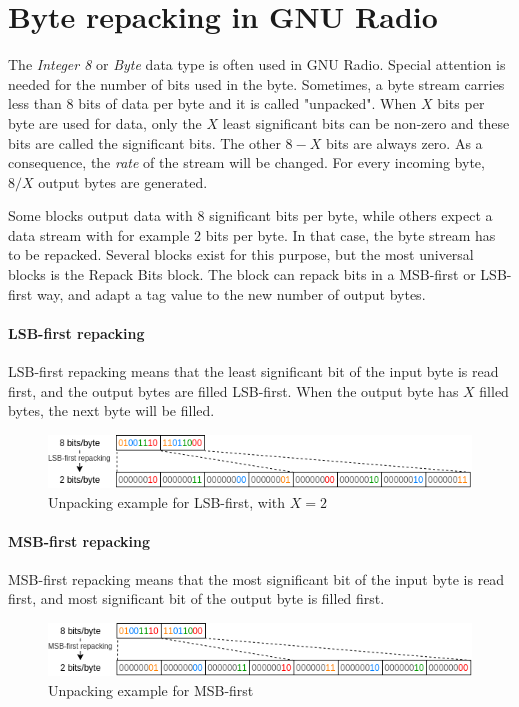 
\appendix

\section{Byte repacking in GNU Radio}
\label{sec:appendix_a}
The \textit{Integer 8} or \textit{Byte} data type is often used in GNU Radio. Special attention is needed for the number of bits used in the byte. 
Sometimes, a byte stream carries less than 8 bits of data per byte and it is called "unpacked". When $X$ bits per byte are used for data, only the $X$ least significant bits can be non-zero and these bits are called the significant bits. The other $8-X$ bits are always zero. As a consequence, the \textit{rate} of the stream will be changed. For every incoming byte, $8/X$ output bytes are generated. \medskip

Some blocks output data with 8 significant bits per byte, while others expect a data stream with for example 2 bits per byte. In that case, the byte stream has to be repacked. Several blocks exist for this purpose, but the most universal blocks is the Repack Bits block. The block can repack bits in a MSB-first or LSB-first way, and adapt a tag value to the new number of output bytes.

\paragraph*{LSB-first repacking}
LSB-first repacking means that the least significant bit of the input byte is read first, and the output bytes are filled LSB-first. When the output byte has $X$ filled bytes, the next byte will be filled.
\begin{figure}[H]
    \centering
    \includegraphics[width=1\textwidth]{img_packets/repacking_lsb.png}
    \caption{Unpacking example for LSB-first, with $X = 2$}
    \label{fig:repacking_lsb}
\end{figure}

\paragraph*{MSB-first repacking}
MSB-first repacking means that the most significant bit of the input byte is read first, and most significant bit of the output byte is filled first.
\begin{figure}[H]
    \centering
    \includegraphics[width=1\textwidth]{img_packets/repacking_msb.png}
    \caption{Unpacking example for MSB-first}
    \label{fig:repacking_msb}
\end{figure}